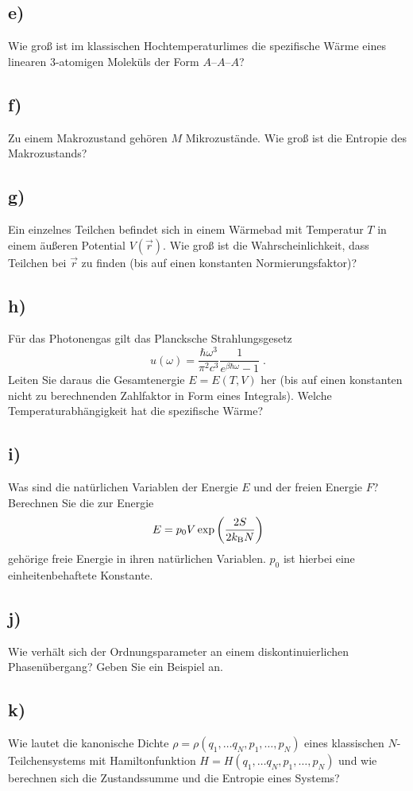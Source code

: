 \subsection{e)}
Wie groß ist im klassischen Hochtemperaturlimes die spezifische Wärme eines linearen 3-atomigen Moleküls der Form $A – A – A$?

\subsection{f)}
Zu einem Makrozustand gehören $M$ Mikrozustände.
Wie groß ist die Entropie des Makrozustands?

\subsection{g)}
Ein einzelnes Teilchen befindet sich in einem Wärmebad mit Temperatur $T$ in einem äußeren Potential $V(\vec r)$. Wie groß ist die Wahrscheinlichkeit, dass Teilchen bei $\vec r$ zu finden (bis auf einen konstanten Normierungsfaktor)?

\subsection{h)}
Für das Photonengas gilt das Plancksche Strahlungsgesetz
\[ 
u(\omega) = \frac{\hbar\omega^3}{\pi^2c^3}\frac{1}{e^{\beta\hbar\omega} - 1} \;.
\]
Leiten Sie daraus die Gesamtenergie $E = E(T,V)$ her (bis auf einen konstanten nicht zu berechnenden Zahlfaktor in Form eines Integrals).
Welche Temperaturabhängigkeit hat die spezifische Wärme?

\subsection{i)}
Was sind die natürlichen Variablen der Energie $E$ und der freien Energie $F$?
Berechnen Sie die zur Energie 
\[ 
    E = p_0 V \exp\left(\frac{2S}{2k_\text{B} N}\right)    
\]
gehörige freie Energie in ihren natürlichen Variablen. 
$p_0$ ist hierbei eine einheitenbehaftete Konstante.
    
    
\subsection{j)}
Wie verhält sich der Ordnungsparameter an einem diskontinuierlichen Phasenübergang? 
Geben Sie ein Beispiel an.

\subsection{k)}
Wie lautet die kanonische Dichte $\rho = \rho(q_1, \ldots q_N, p_1, \ldots, p_N)$ eines klassischen $N$-Teilchensystems mit Hamiltonfunktion $H = H(q_1, \ldots q_N, p_1, \ldots, p_N)$ und wie berechnen sich die Zustandssumme und die Entropie eines Systems?

